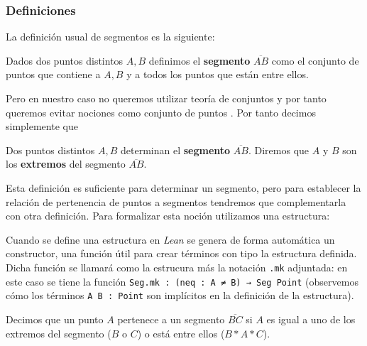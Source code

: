 
\subsubsection{Definiciones}\label{ssec:definiciones_orden}

La definición usual de segmentos es la siguiente:

\begin{defin*}[Segmentos]
	Dados dos puntos distintos $A, B$ definimos el \textbf{segmento}
	$\overline{AB}$ como el conjunto de puntos que contiene a $A, B$ y a todos los
	puntos que están entre ellos.
\end{defin*}

Pero en nuestro caso no queremos utilizar teoría de conjuntos y por tanto
queremos evitar nociones como \guillemotleft conjunto de puntos \guillemotright.
Por tanto decimos simplemente que

\begin{defin*}[Segmentos]
	Dos puntos distintos $A, B$ determinan el \textbf{segmento} $\overline{AB}$.
	Diremos que $A$ y $B$ son los \textbf{extremos} del segmento $\overline{AB}$.
\end{defin*}

Esta definición es suficiente para determinar un segmento, pero para establecer
la relación de pertenencia de puntos a segmentos tendremos que complementarla
con otra definición. Para formalizar esta noción utilizamos una estructura:


Cuando se define una estructura en \textit{Lean} se genera de forma automática
un constructor, una función útil para crear términos con tipo la estructura
definida. Dicha función se llamará como la estrucura más la notación
\lstinline{.mk} adjuntada: en este caso se tiene la función
\lstinline{Seg.mk : (neq : A ≠ B) → Seg Point} (observemos cómo los términos
\lstinline{A B : Point} son implícitos en la definición de la estructura).

\begin{defin*}
	Decimos que un punto $A$ pertenece a un segmento $\overline{BC}$ si $A$ es
	igual a uno de los extremos del segmento ($B$ o $C$) o está entre ellos
	($B * A * C$).
\end{defin*}


